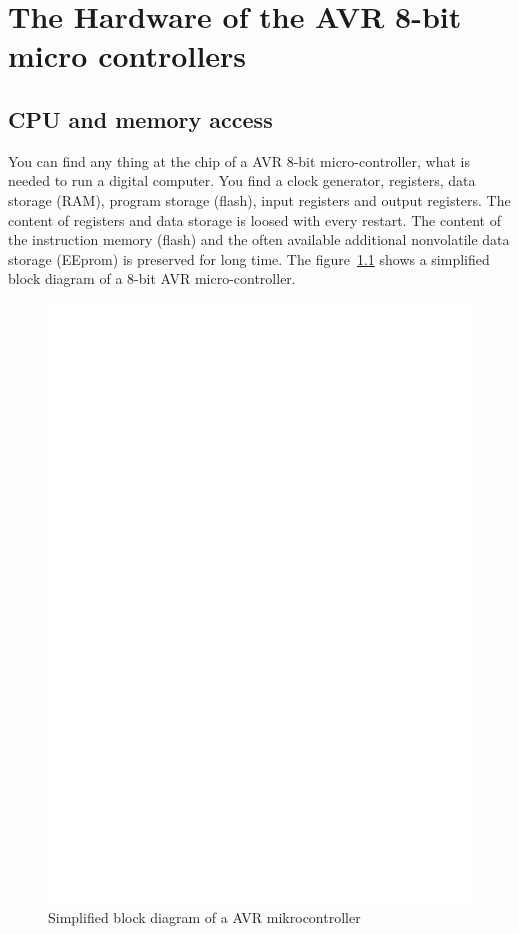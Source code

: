 \chapter{The Hardware of the AVR 8-bit micro controllers}

\section{CPU and memory access}
You can find any thing at the chip of a AVR 8-bit micro-controller,
what is needed to run a digital computer.
You find a clock generator, registers, data storage (RAM), program storage (flash),
input registers and output registers.
The content of registers and data storage is loosed with every restart.
The content of the instruction memory (flash) and the often available additional
nonvolatile data storage (EEprom) is preserved for long time.
The figure~\ref{fig:block} shows a simplified block diagram of a
8-bit AVR micro-controller.

\begin{figure}[H]
\centering
\includegraphics[]{../FIG/avr_block.eps}
\caption{Simplified block diagram of a AVR mikrocontroller}
\label{fig:block}
\end{figure}

